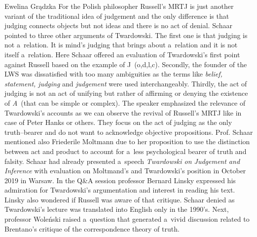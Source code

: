 \begin{editorialeng}{Ewelina Grądzka}
 For the Polish philosopher Russell’s MRTJ is just another variant of the traditional idea of judgement and the only difference is that judging connects objects but not ideas and there is no act of denial. Schaar pointed to three other arguments of Twardowski. The first one is that judging is not a~relation. It is mind’s judging that brings about a~relation and it is not itself a~relation. Here Schaar offered an evaluation of Twardowski’s first point against Russell based on the example of J~(o,d,l,c). Secondly, the founder of the LWS was dissatisfied with too many ambiguities as the terms like \textit{belief, statement, judging} and \textit{judgement} were used interchangeably. Thirdly, the act of judging is not an act of unifying but rather of affirming or denying the existence of \textit{A}~(that can be simple or complex). The speaker emphasized the relevance of Twardowski’s accounts as we can observe the revival of Russell’s MRTJ like in case of Peter Hanks or others. They focus on the act of judging as the only truth--bearer and do not want to acknowledge objective propositions. Prof. Schaar mentioned also Friederile Moltmann due to her proposition to use the distinction between act and product to account for a~less psychological bearer of truth and falsity. Schaar had already presented a~speech \textit{Twardowski on Judgement and Inference} with evaluation on Moltmand’s and Twardowski’s position in October 2019 in Warsaw. In the Q\&A session professor Bernard Linsky expressed his admiration for Twardowski’s argumentation and interest in reading his text. Linsky also wondered if Russell was aware of that critique. Schaar denied as Twardowski’s lecture was translated into English only in the 1990’s. Next, professor Woleński raised a~question that generated a~vivid discussion related to Brentano’s critique of the correspondence theory of truth.


\end{editorialeng}
